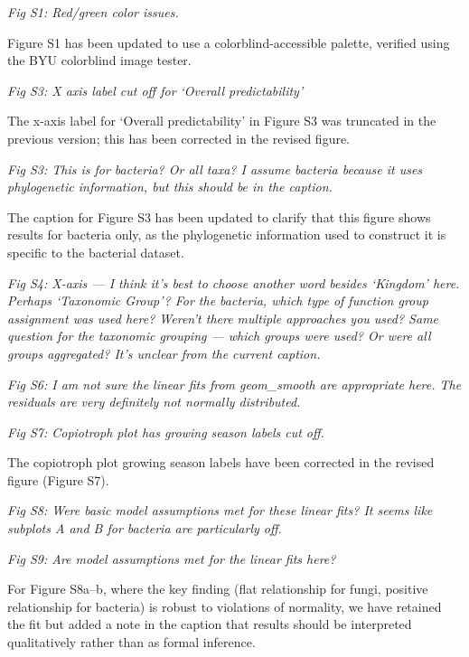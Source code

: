 \documentclass[11pt]{article}
\begin{document}
\bigskip

\textit{Fig S1: Red/green color issues.}

Figure S1 has been updated to use a colorblind-accessible palette, verified using the BYU colorblind image tester.

\bigskip

\textit{Fig S3: X axis label cut off for `Overall predictability'}

The x-axis label for `Overall predictability' in Figure S3 was truncated in the previous version; this has been corrected in the revised figure.

\bigskip

\textit{Fig S3: This is for bacteria? Or all taxa? I assume bacteria because it uses phylogenetic information, but this should be in the caption.}

The caption for Figure S3 has been updated to clarify that this figure shows results for bacteria only, as the phylogenetic information used to construct it is specific to the bacterial dataset.

\bigskip

\textit{Fig S4: X-axis --- I think it's best to choose another word besides `Kingdom' here. Perhaps `Taxonomic Group'? For the bacteria, which type of function group assignment was used here? Weren't there multiple approaches you used? Same question for the taxonomic grouping --- which groups were used? Or were all groups aggregated? It's unclear from the current caption.}

\bigskip

\textit{Fig S6: I am not sure the linear fits from geom\_smooth are appropriate here. The residuals are very definitely not normally distributed.}

\bigskip

\textit{Fig S7: Copiotroph plot has growing season labels cut off.}

The copiotroph plot growing season labels have been corrected in the revised figure (Figure S7).

\bigskip

\textit{Fig S8: Were basic model assumptions met for these linear fits? It seems like subplots A and B for bacteria are particularly off.}

\bigskip

\textit{Fig S9: Are model assumptions met for the linear fits here?}

For Figure S8a--b, where the key finding (flat relationship for fungi, positive relationship for bacteria) is robust to violations of normality, we have retained the fit but added a note in the caption that results should be interpreted qualitatively rather than as formal inference.
\end{document}
